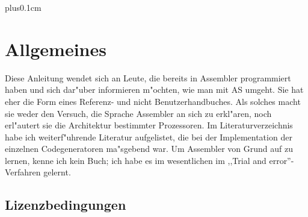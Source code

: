 \documentclass[12pt,a4paper,twoside]{report}
\newif\ifelektor
\begin{document}
\ifelektor
\thispagestyle{empty} \
\clearpage
\thispagestyle{empty} \
\clearpage
\fi


{\parskip 0cm plus0.1cm \tableofcontents}


\cleardoublepage
\chapter{Allgemeines}

Diese Anleitung wendet sich an Leute, die bereits in Assembler programmiert
haben und sich dar"uber informieren m"ochten, wie man mit AS umgeht.  Sie
hat eher die Form eines Referenz- und nicht Benutzerhandbuches.  Als solches
macht sie weder den Versuch, die Sprache Assembler an sich zu erkl"aren, noch
erl"autert sie die Architektur bestimmter Prozessoren.  Im Literaturverzeichnis
habe ich weiterf"uhrende Literatur aufgelistet, die bei der Implementation der
einzelnen Codegeneratoren ma"sgebend war.  Um Assembler von Grund auf zu
lernen, kenne ich kein Buch; ich habe es im wesentlichen im ,,Trial and
error''-Verfahren gelernt.


\section{Lizenzbedingungen}
\label{SectLicense}
\end{document}
